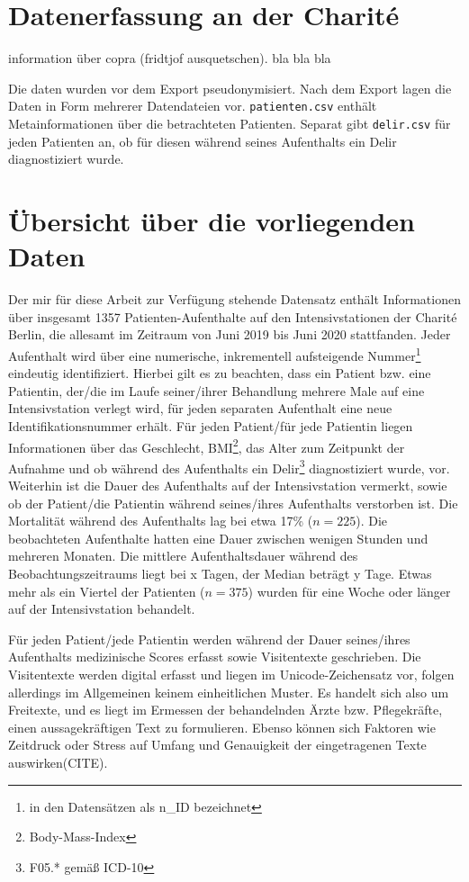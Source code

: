 \section{Datenerfassung an der Charité}
information über copra (fridtjof ausquetschen). bla bla bla

Die daten wurden vor dem Export pseudonymisiert. Nach dem Export lagen die Daten in Form mehrerer Datendateien vor. \texttt{patienten.csv} enthält Metainformationen über die betrachteten Patienten. Separat gibt \texttt{delir.csv} für jeden Patienten an, ob für diesen während seines Aufenthalts ein Delir diagnostiziert wurde.

\section{Übersicht über die vorliegenden Daten}

Der mir für diese Arbeit zur Verfügung stehende Datensatz enthält Informationen über insgesamt 1357 Patienten-Aufenthalte auf den Intensivstationen der Charité Berlin, die allesamt im Zeitraum von Juni 2019 bis Juni 2020 stattfanden. Jeder Aufenthalt wird über eine numerische, inkrementell aufsteigende Nummer\footnote{in den Datensätzen als n\_ID bezeichnet} eindeutig identifiziert. Hierbei gilt es zu beachten, dass ein Patient bzw. eine Patientin, der/die im Laufe seiner/ihrer Behandlung mehrere Male auf eine Intensivstation verlegt wird, für jeden separaten Aufenthalt eine neue Identifikationsnummer erhält. Für jeden Patient/für jede Patientin liegen Informationen über das Geschlecht, BMI\footnote{Body-Mass-Index}, das Alter zum Zeitpunkt der Aufnahme und ob während des Aufenthalts ein Delir\footnote{F05.* gemäß ICD-10} diagnostiziert wurde, vor. Weiterhin ist die Dauer des Aufenthalts auf der Intensivstation vermerkt, sowie ob der Patient/die Patientin während seines/ihres Aufenthalts verstorben ist. Die Mortalität während des Aufenthalts lag bei etwa 17\% ($n=225$). Die beobachteten Aufenthalte hatten eine Dauer zwischen wenigen Stunden und mehreren Monaten. Die mittlere Aufenthaltsdauer während des Beobachtungszeitraums liegt bei x Tagen, der Median beträgt y Tage. Etwas mehr als ein Viertel der Patienten ($n=375$) wurden für eine Woche oder länger auf der Intensivstation behandelt.

Für jeden Patient/jede Patientin werden während der Dauer seines/ihres Aufenthalts medizinische Scores erfasst sowie Visitentexte geschrieben. Die Visitentexte werden digital erfasst und liegen im Unicode-Zeichensatz vor, folgen allerdings im Allgemeinen keinem einheitlichen Muster. Es handelt sich also um Freitexte, und es liegt im Ermessen der behandelnden Ärzte bzw. Pflegekräfte, einen aussagekräftigen Text zu formulieren. Ebenso können sich Faktoren wie Zeitdruck oder Stress auf Umfang und Genauigkeit der eingetragenen Texte auswirken(CITE).

